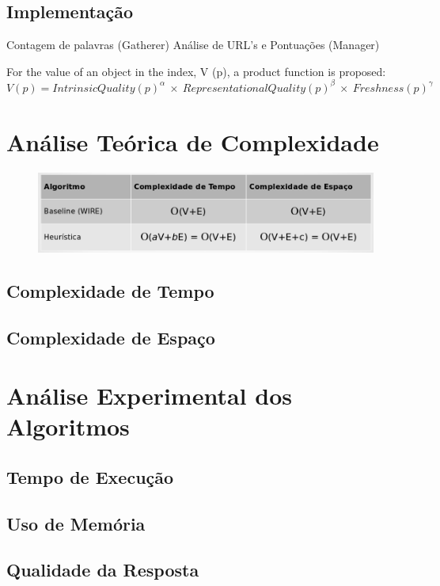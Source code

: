 \documentclass[a4paper,12pt,titlepage]{article}
\begin{document}
\subsection{Implementação}

Contagem de palavras (Gatherer)
Análise de URL's e Pontuações (Manager)


For the value of an object in the index, V (p), a product function is proposed: \\

$V(p) = IntrinsicQuality(p)^\alpha \ \times \ RepresentationalQuality(p)^\beta \ \times \ Freshness(p)^\gamma$



\section{Análise Teórica de Complexidade}

\begin{figure}[H]
     \centering
     \includegraphics[scale=0.4]{figures/complexity.png}
     \caption{}
     \label{bsp}
\end{figure}

\subsection{Complexidade de Tempo}
\subsection{Complexidade de Espaço}

\section{Análise Experimental dos Algoritmos}
\subsection{Tempo de Execução}
\subsection{Uso de Memória}
\subsection{Qualidade da Resposta}
\end{document}
